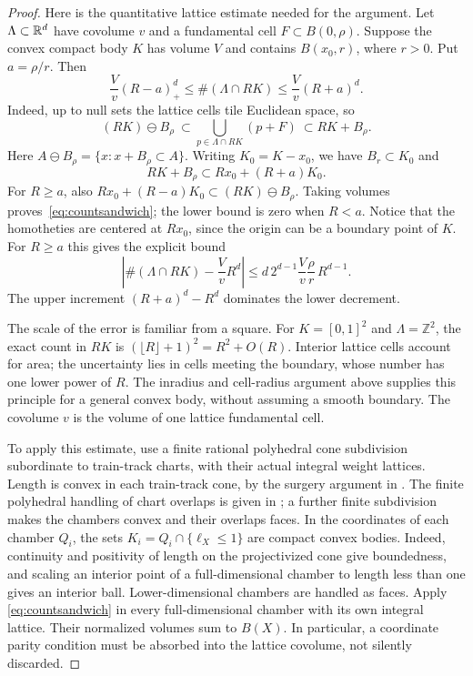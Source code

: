 \begin{proof}
Here is the quantitative lattice estimate needed for the argument.
Let $\Lambda\subset\mathbb R^d$ have covolume $v$ and a fundamental cell
$F\subset B(0,\rho)$.  Suppose the convex compact body $K$ has volume
$V$ and contains $B(x_0,r)$, where $r>0$.  Put $a=\rho/r$.  Then
\begin{equation}
 \frac Vv(R-a)_+^d
 \leq\#(\Lambda\cap RK)
 \leq\frac Vv(R+a)^d.
 \label{eq:countsandwich}
\end{equation}
Indeed, up to null sets the lattice cells tile Euclidean space, so
\[
 (RK)\ominus B_\rho
 \ \subset\!
 \bigcup_{p\in\Lambda\cap RK}(p+F)
 \ \subset RK+B_\rho.
\]
Here $A\ominus B_\rho=\{x:x+B_\rho\subset A\}$.
Writing $K_0=K-x_0$, we have $B_r\subset K_0$ and
\[
 RK+B_\rho\subset Rx_0+(R+a)K_0.
\]
For $R\geq a$, also
$Rx_0+(R-a)K_0\subset(RK)\ominus B_\rho$.
Taking volumes proves~\eqref{eq:countsandwich}; the lower bound is
zero when $R<a$.  Notice that the homotheties are centered at
$Rx_0$, since the origin can be a boundary point of $K$.
For $R\geq a$ this gives the explicit bound
\begin{equation}
 \left|\#(\Lambda\cap RK)-\frac VvR^d\right|
 \leq d\,2^{d-1}\frac Vv\frac\rho r\,R^{d-1}.
 \label{eq:countcellerror}
\end{equation}
The upper increment $(R+a)^d-R^d$ dominates the lower decrement.

The scale of the error is familiar from a square. For
$K=[0,1]^2$ and $\Lambda=\mathbb Z^2$, the exact count in
$RK$ is $(\lfloor R\rfloor+1)^2=R^2+O(R)$.
Interior lattice cells account for area; the uncertainty lies in
cells meeting the boundary, whose number has one lower power of
$R$. The inradius and cell-radius argument above supplies this
principle for a general convex body, without assuming a smooth boundary.
The covolume $v$ is the volume of one lattice fundamental cell.

To apply this estimate, use a finite rational polyhedral cone
subdivision subordinate to train-track charts, with their actual
integral weight lattices. Length is convex in each train-track cone,
by the surgery argument in \cite[Theorem 5.1]{EMMEffective}.
The finite polyhedral handling of chart overlaps is given in
\cite[Lemma 5.1 and the end of the proof of Theorem 1.1 in
Section 8]{EMMEffective}; a further finite subdivision makes the
chambers convex and their overlaps faces. In the coordinates of
each chamber $Q_i$, the sets
$K_i=Q_i\cap\{\ell_X\leq1\}$ are compact convex bodies.
Indeed, continuity and positivity of length on the projectivized
cone give boundedness, and scaling an interior point of a
full-dimensional chamber to length less than one gives an interior
ball. Lower-dimensional chambers are handled as faces. Apply
\eqref{eq:countsandwich} in every full-dimensional chamber with its
own integral lattice.  Their normalized volumes sum to $B(X)$.
In particular, a coordinate parity condition must be absorbed into
the lattice covolume, not silently discarded.


\end{proof}
